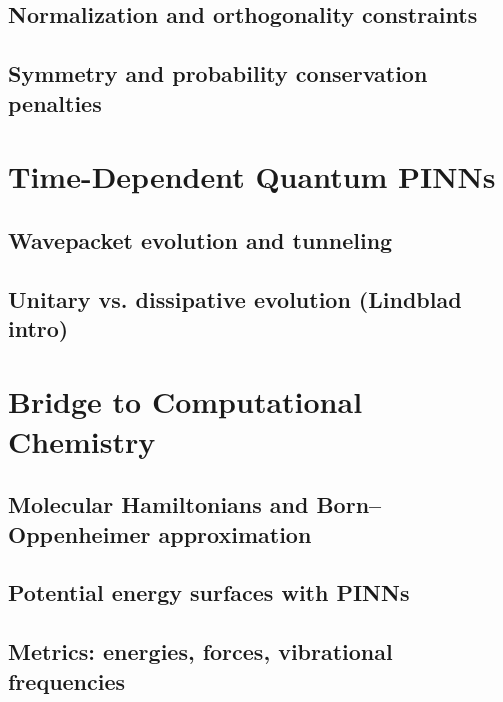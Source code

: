 \subsection{Normalization and orthogonality constraints}

\subsection{Symmetry and probability conservation penalties}

\section{Time-Dependent Quantum PINNs} %

\subsection{Wavepacket evolution and tunneling}

\subsection{Unitary vs. dissipative evolution (Lindblad intro)}

\section{Bridge to Computational Chemistry} %

\subsection{Molecular Hamiltonians and Born--Oppenheimer approximation}

\subsection{Potential energy surfaces with PINNs}

\subsection{Metrics: energies, forces, vibrational frequencies}
